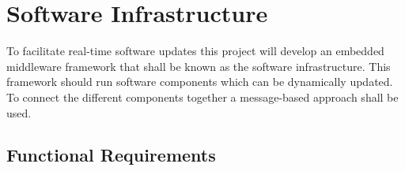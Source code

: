   

\section{Software Infrastructure}

To facilitate real-time software updates this project will develop an embedded middleware framework that shall be known as the software infrastructure. This framework should run software components which can be dynamically updated. To connect the different components together a message-based approach shall be used.


\subsection{Functional Requirements}


